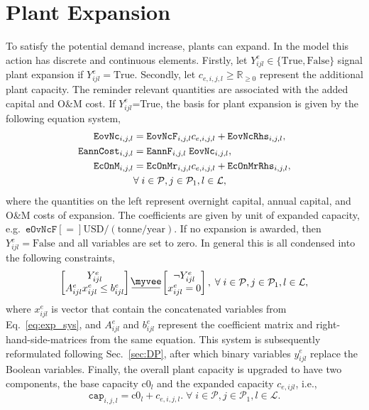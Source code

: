 \documentclass{amsart}
\newcommand{\myveebar}{\mathbin{\vcenter{\hbox{$ \underline{\mkern-2.4mu{\myvee}\mkern-2.4mu} $}}}}
\begin{document}
\section{Plant Expansion}
%
To satisfy the potential demand increase, plants can expand. In the model this
action has discrete and continuous elements. Firstly, let 
$Y^e_{ijl}\in\{\text{True}, \text{False}\}$ signal plant expansion if $Y^e_{ijl} 
= \text{True}$. Secondly, let $c_{e,i,j,l} \geq \mathbb{R}_{\geq 0}$ represent
the additional plant capacity. The reminder relevant quantities are associated
with the added capital and O\&M cost. 
If $Y^e_{ijl}$=True, the basis for plant expansion is given by the following
equation system,
%
\begin{align}\label{eq:exp_sys}
    \mathtt{EovNc}_{i,j,l} &= \mathtt{EovNcF}_{i,j,l} c_{e,i,j,l} 
    + \mathtt{EovNcRhs}_{i,j,l}, \\
    \mathtt{EannCost}_{i,j,l} &= 
    \mathtt{EannF}_{i,j,l}\; \mathtt{EovNc}_{i,j,l},\\
    \mathtt{EcOnM}_{i,j,l} &= 
    \mathtt{EcOnMr}_{i,j,l} c_{e,i,j,l} + \mathtt{EcOnMrRhs}_{i,j,l}, \\
    & \forall \; i \in \mathcal{P},j \in \mathcal{P}_1 ,
    l \in \mathcal{L}, \notag
\end{align}
%
where the quantities on the left represent overnight capital, annual capital,
and O\&M costs of expansion. The coefficients are given by unit of expanded
capacity, e.g.\ $\mathtt{eOvNcF} \left[=\right] \text{USD}/(\text{tonne/year})$.
If no expansion is awarded, then $Y^e_{ijl}=\text{False}$ and all variables are
set to zero. In general this is all condensed into the following constraints,
%
\begin{equation}\label{eq:dp_exp}
    \begin{bmatrix}
        Y^e_{ijl} \\
        A^e_{ijl} x^e_{ijl} \leq b^e_{ijl}
    \end{bmatrix}
    \myveebar
    \begin{bmatrix}
        \neg Y^e_{ijl} \\
        x^e_{ijl} = 0
    \end{bmatrix},
    \; \forall \; i \in \mathcal{P},j \in \mathcal{P}_1 ,
    l \in \mathcal{L},
\end{equation}
%
where $x^e_{ijl}$ is vector that contain the concatenated variables from
Eq.~\eqref{eq:exp_sys}, and  $A^e_{ijl}$ and $b^e_{ijl}$ represent the
coefficient matrix and right-hand-side-matrices from the same equation. This
system is subsequently reformulated following Sec.~\ref{sec:DP}, after which
binary variables $y^e_{ijl}$ replace the Boolean variables.
Finally, the overall plant capacity is upgraded to have two components, the base
capacity $\text{c0}_l$ and the expanded capacity $c_{e,ijl}$, i.e.,
%
\begin{equation}
    \mathtt{cap}_{i,j,l} = \text{c0}_{l} + c_{e,i,j,l}.
    \; \forall \; i \in \mathcal{P},j \in \mathcal{P}_1 ,
    l \in \mathcal{L}.
\end{equation}
%
\end{document}
